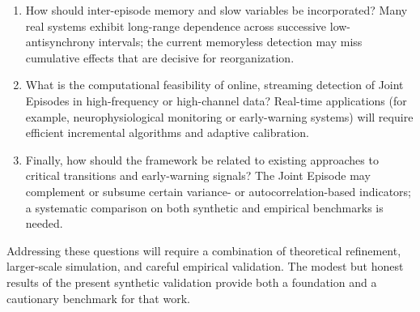 \begin{enumerate}
    \item How should inter-episode memory and slow variables be incorporated? Many real systems exhibit long-range dependence across successive low-antisynchrony intervals; the current memoryless detection may miss cumulative effects that are decisive for reorganization.

    \item What is the computational feasibility of online, streaming detection of Joint Episodes in high-frequency or high-channel data? Real-time applications (for example, neurophysiological monitoring or early-warning systems) will require efficient incremental algorithms and adaptive calibration.

    \item Finally, how should the framework be related to existing approaches to critical transitions and early-warning signals? The Joint Episode may complement or subsume certain variance- or autocorrelation-based indicators; a systematic comparison on both synthetic and empirical benchmarks is needed.
\end{enumerate}

Addressing these questions will require a combination of theoretical refinement, larger-scale simulation, and careful empirical validation. The modest but honest results of the present synthetic validation provide both a foundation and a cautionary benchmark for that work.